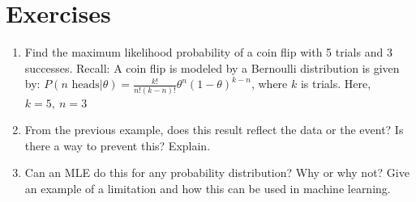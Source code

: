 \section{Exercises}
\begin{enumerate}
    \item Find the maximum likelihood probability of a coin flip with 5 trials and 3 successes. Recall: A coin flip is modeled by a Bernoulli distribution is given by: $P(n\text{ heads}| \theta) = \frac{k!}{n!(k-n)!}\theta^n(1-\theta)^{k-n}$, where $k$ is trials. Here, $k = 5,\ n=3$\\

    \item From the previous example, does this result reflect the data or the event? Is there a way to prevent this? Explain. \\

    \item Can an MLE do this for any probability distribution? Why or why not? Give an example of a limitation and how this can be used in machine learning. 
\end{enumerate}

